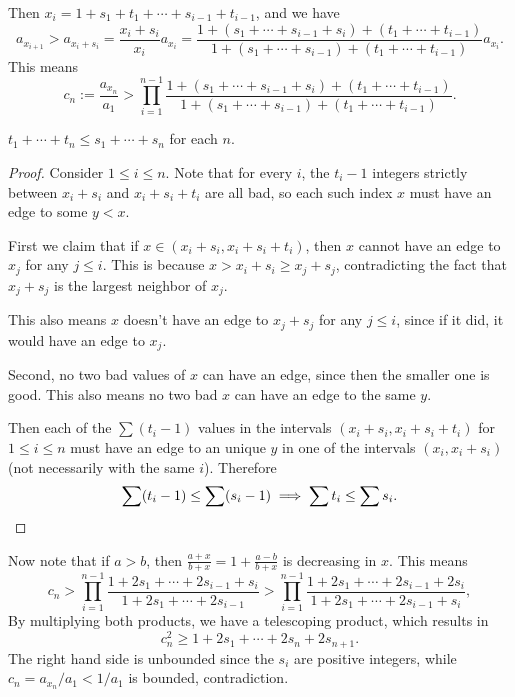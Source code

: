 Then $x_i = 1 + s_1 + t_1 + \dotsb + s_{i - 1} + t_{i - 1}$, and we have
\[a_{x_{i + 1}} > a_{x_i + s_i} = \frac{x_i + s_i}{x_i} a_{x_i} = \frac{1 + (s_1
  + \dotsb + s_{i - 1} + s_i) + (t_1 + \dotsb + t_{i - 1})}{1 + (s_1 + \dotsb +
s_{i - 1}) + (t_1 + \dotsb + t_{i - 1})}a_{x_i}.\] This means
\[c_n := \frac{a_{x_n}}{a_1} > \prod_{i = 1}^{n-1} \frac{1 + (s_1 + \dotsb +
s_{i-1} + s_{i}) + (t_1 + \dotsb + t_{i-1})}{1 + (s_1 + \dotsb + s_{i-1}) + (t_1
+ \dotsb + t_{i-1})}.\]

\begin{lemma*}
  $t_1 + \dotsb + t_n \leq s_1 + \dotsb + s_n$ for each $n$.
\end{lemma*}

\begin{proof}
  Consider $1 \leq i \leq n$. Note that for every $i$, the $t_i - 1$ integers strictly between $x_i + s_i$ and $x_i + s_i + t_i$ are all bad, so each such index $x$ must have an edge to some $y < x$.

  First we claim that if $x \in (x_i + s_i, x_i + s_i + t_i)$, then $x$ cannot
  have an edge to $x_j$ for any $j \leq i$. This is because $x > x_i + s_i
  \geq x_j + s_j$, contradicting the fact that $x_j + s_j$ is the largest
  neighbor of $x_j$.

  This also means $x$ doesn't have an edge to $x_j + s_j$ for any $j \leq i$, since if it did, it would have an edge to $x_j$.

  Second, no two bad values of $x$ can have an edge, since then the smaller
  one is good. This also means no two bad $x$ can have an edge to the same $y$.

  Then each of the $\sum (t_i - 1)$ values in the intervals $(x_i+s_i,
  x_i+s_i+t_i)$ for $1 \leq i \leq n$ must have an edge to an unique $y$ in one
  of the intervals $(x_i, x_i + s_i)$ (not necessarily with the same $i$). Therefore
  \[\sum (t_i - 1) \leq \sum (s_i - 1)\implies \sum t_i \leq \sum s_i.\qedhere\]
\end{proof}

Now note that if $a > b$, then $\frac{a + x}{b + x} = 1 + \frac{a - b}{b + x}$
is decreasing in $x$. This means
\[c_n > \prod_{i = 1}^{n-1} \frac{1 + 2s_1 + \dotsb + 2s_{i-1} + s_{i}}{1 + 2s_1
    + \dotsb + 2s_{i-1}} > \prod_{i = 1}^{n-1} \frac{1 + 2s_1 + \dotsb +
    2s_{i-1} + 2s_{i}}{1 + 2s_1 + \dotsb + 2s_{i-1} + s_{i}},\]
By multiplying both products, we have a telescoping product, which results in
\[c_n^2 \geq 1 + 2s_1 + \dotsb + 2s_n + 2s_{n + 1}.\]
The right hand side is unbounded since the $s_i$ are positive integers, while
$c_n = a_{x_n}/a_1 < 1/a_1$ is bounded, contradiction.

